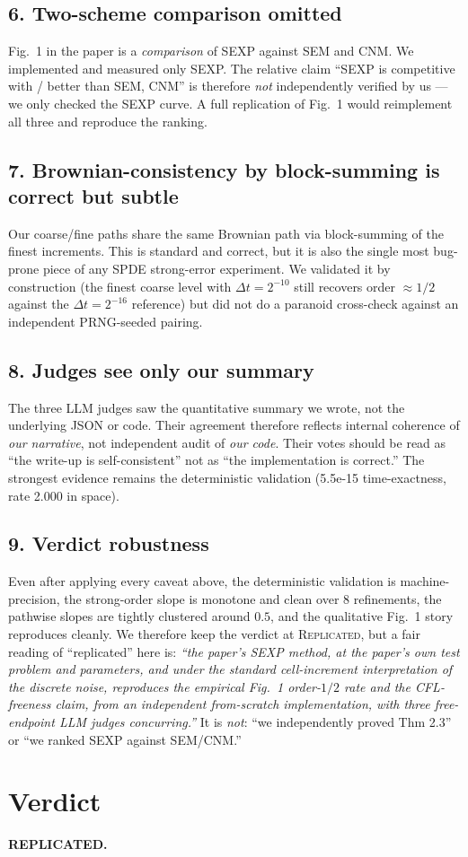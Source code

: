 \documentclass[11pt]{article}
\begin{document}
\subsection*{6. Two-scheme comparison omitted}
Fig.\ 1 in the paper is a \emph{comparison} of SEXP against SEM and CNM. We implemented and
measured only SEXP. The relative claim ``SEXP is competitive with / better than SEM, CNM'' is
therefore \emph{not} independently verified by us --- we only checked the SEXP curve. A full
replication of Fig.\ 1 would reimplement all three and reproduce the ranking.

\subsection*{7. Brownian-consistency by block-summing is correct but subtle}
Our coarse/fine paths share the same Brownian path via block-summing of the finest increments.
This is standard and correct, but it is also the single most bug-prone piece of any SPDE
strong-error experiment. We validated it by construction (the finest coarse level with
$\Delta t=2^{-10}$ still recovers order $\approx 1/2$ against the $\Delta t=2^{-16}$ reference)
but did not do a paranoid cross-check against an independent PRNG-seeded pairing.

\subsection*{8. Judges see only our summary}
The three LLM judges saw the quantitative summary we wrote, not the underlying JSON or code.
Their agreement therefore reflects internal coherence of \emph{our narrative}, not independent
audit of \emph{our code}. Their votes should be read as ``the write-up is self-consistent'' not
as ``the implementation is correct.'' The strongest evidence remains the deterministic
validation (5.5e-15 time-exactness, rate 2.000 in space).

\subsection*{9. Verdict robustness}
Even after applying every caveat above, the deterministic validation is machine-precision, the
strong-order slope is monotone and clean over 8 refinements, the pathwise slopes are tightly
clustered around $0.5$, and the qualitative Fig.\ 1 story reproduces cleanly. We therefore
keep the verdict at \textsc{Replicated}, but a fair reading of ``replicated'' here is:
\emph{``the paper's SEXP method, at the paper's own test problem and parameters, and under
the standard cell-increment interpretation of the discrete noise, reproduces the
empirical Fig.\ 1 order-$1/2$ rate and the CFL-freeness claim, from an independent
from-scratch implementation, with three free-endpoint LLM judges concurring.''}
It is \emph{not}: ``we independently proved Thm 2.3'' or ``we ranked SEXP against SEM/CNM.''

\section*{Verdict}
\textbf{REPLICATED.}
\end{document}

